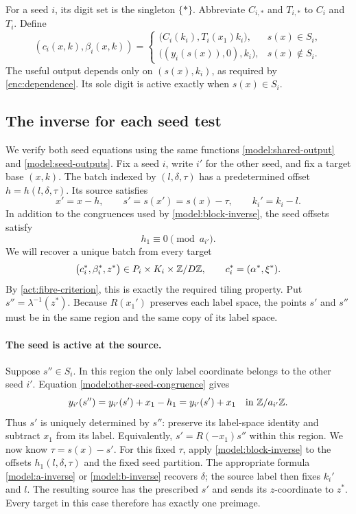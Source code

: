 For a seed $i$, its digit set is the singleton $\{*\}$.  Abbreviate
$C_{i,*}$ and $T_{i,*}$ to $C_i$ and $T_i$.  Define
\begin{equation}\label{model:seed-outputs}
 (c_i(x,k),\beta_i(x,k))=
 \begin{cases}
 \bigl(C_i(k_i),T_i(x_1)k_i\bigr),&s(x)\in S_i,\\
 \bigl((y_i(s(x)),0),k_i\bigr),&s(x)\notin S_i.
 \end{cases}
\end{equation}
The useful output depends only on $(s(x),k_i)$, as required by
\eqref{enc:dependence}.  Its sole digit is active exactly when
$s(x)\in S_i$.

\subsection{The inverse for each seed test}

We verify both seed equations using the same functions
\eqref{model:shared-output} and \eqref{model:seed-outputs}.  Fix a seed
$i$, write $i'$ for the other seed, and fix a target base $(x,k)$.
The batch indexed by $(l,\delta,\tau)$ has a predetermined offset
$h=h(l,\delta,\tau)$.  Its source satisfies
\[
 x'=x-h,\qquad s'=s(x')=s(x)-\tau,\qquad k_i'=k_i-l.
\]
In addition to the congruences used by \cref{model:block-inverse},
the seed offsets satisfy
\begin{equation}\label{model:other-seed-congruence}
 h_1\equiv0\pmod{a_{i'}}.
\end{equation}
We will recover a unique batch from every target
\[
 \bigl(c_i^*,\beta_i^*,z^*\bigr)
 \in P_i\times K_i\times\mathbb Z/D\mathbb Z,
 \qquad c_i^*=(\alpha^*,\xi^*).
\]
By \cref{act:fibre-criterion}, this is exactly the required tiling
property.  Put $s''=\lambda^{-1}(z^*)$.  Because $R(x_1')$ preserves
each label space, the points $s'$ and $s''$ must be in the same
region and the same copy of its label space.

\paragraph{The seed is active at the source.}
Suppose $s''\in S_i$.  In this region the only label coordinate
belongs to the other seed $i'$.  Equation
\eqref{model:other-seed-congruence} gives
\[
 y_{i'}(s'')=y_{i'}(s')+x_1-h_1
            =y_{i'}(s')+x_1
 \quad\text{in }\mathbb Z/a_{i'}\mathbb Z.
\]
Thus $s'$ is uniquely determined by $s''$: preserve its label-space
identity and subtract $x_1$ from its label.  Equivalently,
$s'=R(-x_1)s''$ within this region.  We now know
$\tau=s(x)-s'$.  For this fixed $\tau$, apply
\cref{model:block-inverse} to the offsets $h_1(l,\delta,\tau)$ and the
fixed seed partition.  The appropriate formula
\eqref{model:a-inverse} or \eqref{model:b-inverse} recovers $\delta$;
the source label then fixes $k_i'$ and $l$.  The resulting source has the prescribed $s'$
and sends its $z$-coordinate to $z^*$.  Every target in this case
therefore has exactly one preimage.

